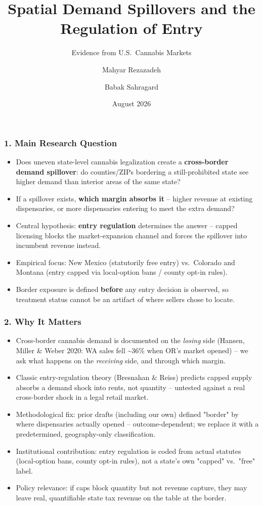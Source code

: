 \documentclass[11pt]{beamer}
\title{Spatial Demand Spillovers and the Regulation of Entry}
\subtitle{Evidence from U.S.\ Cannabis Markets}
\author{Mahyar Rezazadeh \and Babak Sahragard}
\date{August 2026}
\begin{document}
\begin{frame}
\frametitle{1. Main Research Question}
\small
\begin{itemize}
  \item Does uneven state-level cannabis legalization create a \textbf{cross-border demand spillover}: do counties/ZIPs bordering a still-prohibited state see higher demand than interior areas of the same state?
  \item If a spillover exists, \textbf{which margin absorbs it} -- higher revenue at existing dispensaries, or more dispensaries entering to meet the extra demand?
  \item Central hypothesis: \textbf{entry regulation} determines the answer -- capped licensing blocks the market-expansion channel and forces the spillover into incumbent revenue instead.
  \item Empirical focus: New Mexico (statutorily free entry) vs.\ Colorado and Montana (entry capped via local-option bans / county opt-in rules).
  \item Border exposure is defined \textbf{before} any entry decision is observed, so treatment status cannot be an artifact of where sellers chose to locate.
\end{itemize}
\end{frame}

\begin{frame}
\frametitle{2. Why It Matters}
\small
\begin{itemize}
  \item Cross-border cannabis demand is documented on the \emph{losing} side (Hansen, Miller \& Weber 2020: WA sales fell \textasciitilde36\% when OR's market opened) -- we ask what happens on the \emph{receiving} side, and through which margin.
  \item Classic entry-regulation theory (Bresnahan \& Reiss) predicts capped supply absorbs a demand shock into rents, not quantity -- untested against a real cross-border shock in a legal retail market.
  \item Methodological fix: prior drafts (including our own) defined "border" by where dispensaries actually opened -- outcome-dependent; we replace it with a predetermined, geography-only classification.
  \item Institutional contribution: entry regulation is coded from actual statutes (local-option bans, county opt-in rules), not a state's own "capped" vs.\ "free" label.
  \item Policy relevance: if caps block quantity but not revenue capture, they may leave real, quantifiable state tax revenue on the table at the border.
\end{itemize}
\end{frame}
\end{document}
